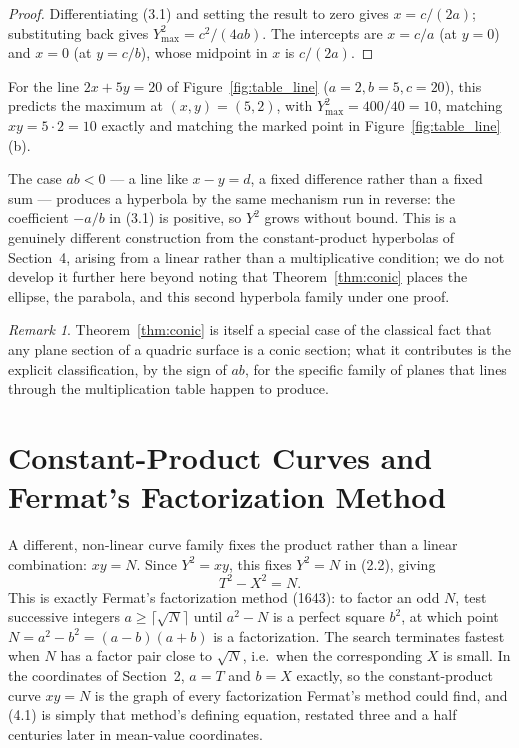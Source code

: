\documentclass[11pt]{amsart}
\theoremstyle{remark}
\newtheorem*{remark}{Remark}
\begin{document}
\begin{proof}
Differentiating (3.1) and setting the result to zero gives $x=c/(2a)$; substituting back gives $Y^2_{\max}=c^2/(4ab)$. The intercepts are $x=c/a$ (at $y=0$) and $x=0$ (at $y=c/b$), whose midpoint in $x$ is $c/(2a)$.
\end{proof}

For the line $2x+5y=20$ of Figure~\ref{fig:table_line} ($a=2,b=5,c=20$), this predicts the maximum at $(x,y)=(5,2)$, with $Y^2_{\max}=400/40=10$, matching $xy=5\cdot2=10$ exactly and matching the marked point in Figure~\ref{fig:table_line}(b).

The case $ab<0$ --- a line like $x-y=d$, a fixed difference rather than a fixed sum --- produces a hyperbola by the same mechanism run in reverse: the coefficient $-a/b$ in (3.1) is positive, so $Y^2$ grows without bound. This is a genuinely different construction from the constant-product hyperbolas of Section~4, arising from a linear rather than a multiplicative condition; we do not develop it further here beyond noting that Theorem~\ref{thm:conic} places the ellipse, the parabola, and this second hyperbola family under one proof.

\begin{remark}
Theorem~\ref{thm:conic} is itself a special case of the classical fact that any plane section of a quadric surface is a conic section; what it contributes is the explicit classification, by the sign of $ab$, for the specific family of planes that lines through the multiplication table happen to produce.
\end{remark}

\section{Constant-Product Curves and Fermat's Factorization Method}

A different, non-linear curve family fixes the product rather than a linear combination: $xy=N$. Since $Y^2=xy$, this fixes $Y^2=N$ in (2.2), giving
\begin{equation}
T^2-X^2=N. \tag{4.1}
\end{equation}
This is exactly Fermat's factorization method (1643): to factor an odd $N$, test successive integers $a\ge\lceil\sqrt N\rceil$ until $a^2-N$ is a perfect square $b^2$, at which point $N=a^2-b^2=(a-b)(a+b)$ is a factorization. The search terminates fastest when $N$ has a factor pair close to $\sqrt N$, i.e.\ when the corresponding $X$ is small. In the coordinates of Section~2, $a=T$ and $b=X$ exactly, so the constant-product curve $xy=N$ is the graph of every factorization Fermat's method could find, and (4.1) is simply that method's defining equation, restated three and a half centuries later in mean-value coordinates.
\end{document}
